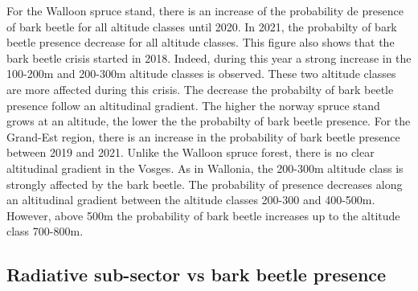 \documentclass[3p,times]{elsarticle}
\begin{document}
For the Walloon spruce stand, there is an increase of the probability de presence of bark beetle for all altitude classes until 2020.
 In 2021, the probabilty of bark beetle presence decrease for all altitude classes.
This figure also shows that the bark beetle crisis started in 2018. Indeed, during this year a strong increase in the 100-200m and 200-300m altitude classes is observed. These two altitude classes are more affected during this crisis.  
The decrease the probabilty of bark beetle presence follow an altitudinal gradient. The higher the norway spruce stand grows at an altitude, the lower the the probabilty of bark beetle presence. For the Grand-Est region, there is an increase in the probability of bark beetle presence between 2019 and 2021. Unlike the Walloon spruce forest, there is no clear altitudinal gradient in the Vosges. As in Wallonia, the 200-300m altitude class is strongly affected by the bark beetle. The probability of presence decreases along an altitudinal gradient between the altitude classes 200-300 and 400-500m. However, above 500m the probability of bark beetle increases up to the altitude class 700-800m.


	




\subsection{Radiative sub-sector vs bark beetle presence}


 
\end{document}
